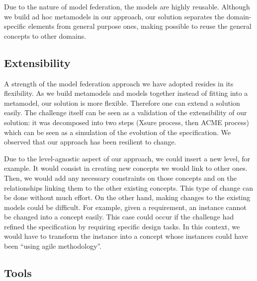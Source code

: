   Due to the nature of model federation, the models are highly reusable.
  Although we build ad hoc metamodels in our approach, our solution separates
  the domain-specific elements from general purpose ones, making possible to
  reuse the general concepts to other domains.

  \subsection{Extensibility}


  A strength of the  model federation approach we have adopted resides in its
  flexibility. As we build metamodels and models together instead of fitting
  into a metamodel, our solution is more flexible. Therefore one can extend a
  solution easily. The challenge itself can be seen as a validation of the
  extensibility of our solution: it was decomposed into two steps
  (Xsure process, then ACME process) which can be seen as a simulation of the
  evolution of the specification. We observed that our approach has been
  resilient to change.

  Due to the level-agnostic aspect of our approach, we could insert a new
  level, for example. It would consist in creating new concepts we would link
  to other ones. Then, we would add any necessary constraints on those concepts
  and on the relationships linking them to the other existing concepts. This
  type of change can be done without much effort. On the other hand, making
  changes to the existing models could be difficult. For example, given a
  requirement, an instance cannot be changed into a concept easily. This case
  could occur if the challenge had refined the specification by requiring
  specific design tasks. In this context, we would have to transform the
   instance into a concept whose instances could have been
  \enquote{using agile methodology}.



\subsection{Tools}

